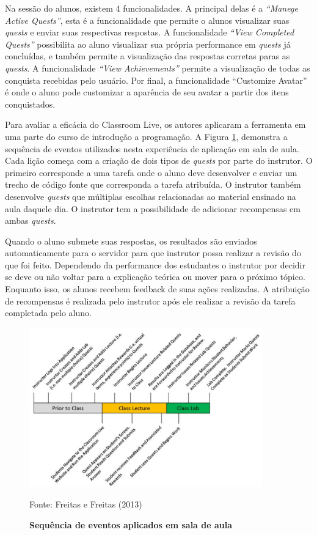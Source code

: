 \documentclass[
	12pt,				%
	oneside,			%
	a4paper,			%
	english,			%
	french,				%
	spanish,			%
	brazil,				%
	]{abntex2}
\begin{document}
Na sessão do alunos, existem 4 funcionalidades. A principal delas é a \textit{“Manege Active Quests”}, esta é a funcionalidade que permite o alunos visualizar suas \textit{quests} e enviar suas respectivas respostas. A funcionalidade \textit{“View Completed Quests”} possibilita ao aluno visualizar sua própria performance em \textit{quests} já concluídas, e também permite a visualização das respostas corretas paras as \textit{quests}. A funcionalidade \textit{“View Achievements”} permite a visualização de todas as conquista recebidas pelo usuário. Por final, a funcionalidade “Customize Avatar” é onde o aluno pode customizar a aparência de seu avatar a partir dos itens conquistados.

Para avaliar a eficácia do Classroom Live, os autores aplicaram a ferramenta em uma parte do curso de introdução a programação. A Figura \ref{fig:classroom_aula}, demonstra a sequência de eventos utilizados nesta experiência de aplicação em sala de aula. Cada lição começa com a criação de dois tipos de \textit{quests} por parte do instrutor. O primeiro corresponde a uma tarefa onde o aluno deve desenvolver e enviar um trecho de código fonte que corresponda a tarefa atribuída. O instrutor também desenvolve \textit{quests} que múltiplas escolhas relacionadas ao material ensinado na aula daquele dia. O instrutor tem a possibilidade de adicionar recompensas em ambas \textit{quests}.

Quando o aluno submete suas respostas, os resultados são enviados automaticamente para o servidor para que instrutor possa realizar a revisão do que foi feito. Dependendo da performance dos estudantes o instrutor por decidir se deve ou não voltar para a explicação teórica ou mover para o próximo tópico. Enquanto isso, os alunos recebem feedback de suas ações realizadas. A atribuição de recompensas é realizada pelo instrutor após ele realizar a revisão da tarefa completada pelo aluno.

\begin{figure}[ht]
\centering
\caption{\textbf{Sequência de eventos aplicados em sala de aula}}
\includegraphics[width=0.9\textwidth]{imagens/classroom_aula.png}

Fonte: Freitas e Freitas (2013)
\label{fig:classroom_aula}
\end{figure}
\end{document}
